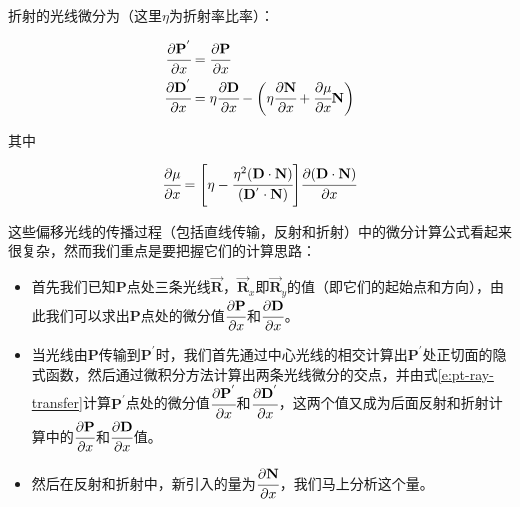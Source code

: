 \noindent 折射的光线微分为（这里$\eta$为折射率比率）：

\begin{equation}
	\begin{aligned}
		 \cfrac{{\rm \partial}\mathbf{P}^{'}}{{\rm \partial} x}&= \cfrac{{\rm \partial}\mathbf{P}}{{\rm \partial} x}\\
		 \cfrac{{\rm \partial}\mathbf{D}^{'}}{{\rm \partial} x}&=\eta \cfrac{{\rm \partial}\mathbf{D}}{{\rm \partial} x}-\bigg(\eta \cfrac{{\rm \partial}\mathbf{N}}{{\rm \partial} x}+ \cfrac{{\rm \partial}\mu }{{\rm \partial} x}\mathbf{N}\bigg)
	\end{aligned}
\end{equation}

\noindent 其中

\begin{equation}
	 \cfrac{{\rm \partial}\mu }{{\rm \partial} x}=\Bigg[ \eta- \cfrac{\eta^{2}(\mathbf{D}\cdot\mathbf{N})}{(\mathbf{D}^{'}\cdot\mathbf{N})} \Bigg] \cfrac{{\rm \partial} (\mathbf{D}\cdot\mathbf{N})}{{\rm \partial} x}
\end{equation}

这些偏移光线的传播过程（包括直线传输，反射和折射）中的微分计算公式看起来很复杂，然而我们重点是要把握它们的计算思路：

\begin{itemize}
	\item 首先我们已知$\mathbf{P}$点处三条光线$\overrightarrow{\mathbf{R}}$，$\overrightarrow{\mathbf{R}}_x$即$\overrightarrow{\mathbf{R}}_y$的值（即它们的起始点和方向），由此我们可以求出$\mathbf{P}$点处的微分值$ \cfrac{{\rm \partial}\mathbf{P}}{{\rm \partial} x}$和$ \cfrac{{\rm \partial}\mathbf{D}}{{\rm \partial} x}$。
	\item 当光线由$\mathbf{P}$传输到$\mathbf{P}^{'}$时，我们首先通过中心光线的相交计算出$\mathbf{P}^{'}$处正切面的隐式函数，然后通过微积分方法计算出两条光线微分的交点，并由式\ref{e:pt-ray-transfer}计算$\mathbf{P}^{'}$点处的微分值$ \cfrac{{\rm \partial}\mathbf{P}^{'}}{{\rm \partial} x}$和$ \cfrac{{\rm \partial}\mathbf{D}^{'}}{{\rm \partial} x}$，这两个值又成为后面反射和折射计算中的$ \cfrac{{\rm \partial}\mathbf{P}}{{\rm \partial} x}$和$ \cfrac{{\rm \partial}\mathbf{D}}{{\rm \partial} x}$值。
	\item 然后在反射和折射中，新引入的量为$ \cfrac{{\rm \partial} \mathbf{N}}{{\rm \partial} x}$，我们马上分析这个量。
\end{itemize}

